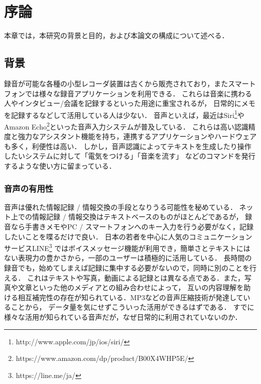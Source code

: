 \chapter{序論}
\label{chap:introduction}

本章では，本研究の背景と目的，および本論文の構成について述べる．

\newpage

\section{背景}

録音が可能な各種の小型レコーダ装置は古くから販売されており，またスマートフォンでは様々な録音アプリケーションを利用できる．
これらは音楽に携わる人やインタビュー/会議を記録するといった用途に重宝されるが，
日常的にメモを記録するなどして活用している人は少ない．
音声といえば，最近はSiri\footnote{\textsf{http://www.apple.com/jp/ios/siri/}}や
Amazon Echo\footnote{\textsf{https://www.amazon.com/dp/product/B00X4WHP5E/}}といった音声入力システムが普及している．
これらは高い認識精度と強力なアシスタント機能を持ち，連携するアプリケーションやハードウェアも多く，利便性は高い．
しかし，音声認識によってテキストを生成したり操作したいシステムに対して「電気をつける」「音楽を流す」
などのコマンドを発行するような使い方に留まっている．

\subsection{音声の有用性}

音声は優れた情報記録 / 情報交換の手段となりうる可能性を秘めている．
ネット上での情報記録 / 情報交換はテキストベースのものがほとんどであるが，
録音なら手書きメモやPC / スマートフォンへのキー入力を行う必要がなく，記録したいことを喋るだけで良い．
日本の若者を中心に人気のコミュニケーションサービスLINE\footnote{\textsf{https://line.me/ja/}}
ではボイスメッセージ機能が利用でき，簡単さとテキストにはない表現力の豊かさから，一部のユーザーは積極的に活用している．
長時間の録音でも，始めてしまえば記録に集中する必要がないので，同時に別のことを行える．
これはテキストや写真，動画による記録とは異なる点である．また，写真や文章といった他のメディアとの組み合わせによって，
互いの内容理解を助ける相互補完性の存在が知られている\cite{Nakakura}．MP3などの音声圧縮技術が発達していることから，
データ量を気にせずこういった活用ができるはずである．
すでに様々な活用が知られている音声だが，なぜ日常的に利用されていないのか．


